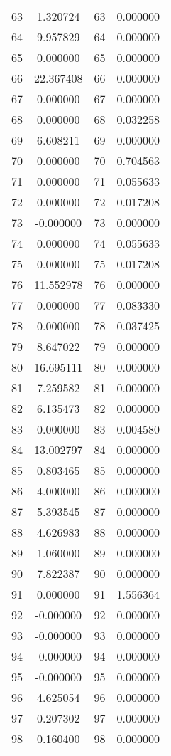 \documentclass[12pt]{article}
\begin{document}
\begin{longtable}{@{}cccc@{}}
63 & 1.320724 & 63 & 0.000000 \\
64 & 9.957829 & 64 & 0.000000 \\
65 & 0.000000 & 65 & 0.000000 \\
66 & 22.367408 & 66 & 0.000000 \\
67 & 0.000000 & 67 & 0.000000 \\
68 & 0.000000 & 68 & 0.032258 \\
69 & 6.608211 & 69 & 0.000000 \\
70 & 0.000000 & 70 & 0.704563 \\
71 & 0.000000 & 71 & 0.055633 \\
72 & 0.000000 & 72 & 0.017208 \\
73 & -0.000000 & 73 & 0.000000 \\
74 & 0.000000 & 74 & 0.055633 \\
75 & 0.000000 & 75 & 0.017208 \\
76 & 11.552978 & 76 & 0.000000 \\
77 & 0.000000 & 77 & 0.083330 \\
78 & 0.000000 & 78 & 0.037425 \\
79 & 8.647022 & 79 & 0.000000 \\
80 & 16.695111 & 80 & 0.000000 \\
81 & 7.259582 & 81 & 0.000000 \\
82 & 6.135473 & 82 & 0.000000 \\
83 & 0.000000 & 83 & 0.004580 \\
84 & 13.002797 & 84 & 0.000000 \\
85 & 0.803465 & 85 & 0.000000 \\
86 & 4.000000 & 86 & 0.000000 \\
87 & 5.393545 & 87 & 0.000000 \\
88 & 4.626983 & 88 & 0.000000 \\
89 & 1.060000 & 89 & 0.000000 \\
90 & 7.822387 & 90 & 0.000000 \\
91 & 0.000000 & 91 & 1.556364 \\
92 & -0.000000 & 92 & 0.000000 \\
93 & -0.000000 & 93 & 0.000000 \\
94 & -0.000000 & 94 & 0.000000 \\
95 & -0.000000 & 95 & 0.000000 \\
96 & 4.625054 & 96 & 0.000000 \\
97 & 0.207302 & 97 & 0.000000 \\
98 & 0.160400 & 98 & 0.000000 \\

\end{longtable}
\end{document}
